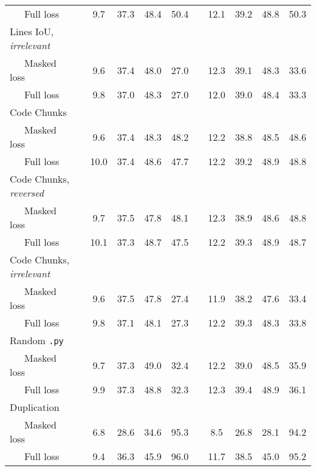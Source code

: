 \documentclass{standalone}
\begin{document}
\begin{table}
\begin{tabular}{lc cc>{\columncolor{gray!30}}cc c cc>{\columncolor{gray!30}}cc}
    ~~~Full loss & & 9.7 & 37.3 & 48.4 & 50.4 & & 12.1 & 39.2 & 48.8 & 50.3 \\
    \cmidrule(lr){1-1}
    Lines IoU, \textit{irrelevant} & & & & & & & & & & \\
    ~~~Masked loss & & 9.6 & 37.4 & 48.0 & 27.0 & & 12.3 & 39.1 & 48.3 & 33.6 \\
    ~~~Full loss & & 9.8 & 37.0 & 48.3 & 27.0 & & 12.0 & 39.0 & 48.4 & 33.3 \\
    \cmidrule(lr){1-1}
    Code Chunks & & & & & & & & & & \\
    ~~~Masked loss & & 9.6 & 37.4 & 48.3 & 48.2 & & 12.2 & 38.8 & 48.5 & 48.6 \\
    ~~~Full loss & & 10.0 & 37.4 & 48.6 & 47.7 & & 12.2 & 39.2 & 48.9 & 48.8 \\
    \cmidrule(lr){1-1}
    Code Chunks, \textit{reversed} & & & & & & & & & & \\
    ~~~Masked loss & & 9.7 & 37.5 & 47.8 & 48.1 & & 12.3 & 38.9 & 48.6 & 48.8 \\
    ~~~Full loss & & 10.1 & 37.3 & 48.7 & 47.5 & & 12.2 & 39.3 & 48.9 & 48.7 \\
    \cmidrule(lr){1-1}
    Code Chunks, \textit{irrelevant} & & & & & & & & & & \\
    ~~~Masked loss & & 9.6 & 37.5 & 47.8 & 27.4 & & 11.9 & 38.2 & 47.6 & 33.4 \\
    ~~~Full loss & & 9.8 & 37.1 & 48.1 & 27.3 & & 12.2 & 39.3 & 48.3 & 33.8 \\
    \cmidrule(lr){1-1}
    Random \texttt{.py} & & & & & & & & & & \\
    ~~~Masked loss & & 9.7 & 37.3 & 49.0 & 32.4 & & 12.2 & 39.0 & 48.5 & 35.9 \\
    ~~~Full loss & & 9.9 & 37.3 & 48.8 & 32.3 & & 12.3 & 39.4 & 48.9 & 36.1 \\
    \midrule
    Duplication & & & & & & & & & & \\
    ~~~Masked loss & & 6.8 & 28.6 & 34.6 & 95.3 & & 8.5 & 26.8 & 28.1 & 94.2 \\
    ~~~Full loss & & 9.4 & 36.3 & 45.9 & 96.0 & & 11.7 & 38.5 & 45.0 & 95.2 \\
    
    \bottomrule
    \end{tabular}
\end{table}
\end{document}
